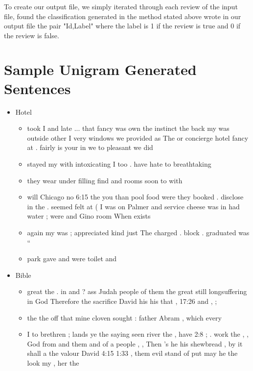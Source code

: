 \documentclass[11pt]{article}
\begin{document}

To create our output file, we simply iterated through each review of the input file, found the classification generated in the method stated above wrote in our output file the pair "Id,Label" where the label is 1 if the review is true and 0 if the review is false.



\section{Sample Unigram Generated Sentences}
\begin{itemize}
    \item Hotel
        \begin{itemize}
            \item took I and late ... that fancy was own the instinct the back my was outside other I very windows we provided as The or concierge hotel fancy at . fairly is your in we to pleasant we did
            \item stayed my with intoxicating I too . have hate to breathtaking
            \item they wear under filling find and rooms soon to with
            \item will Chicago no 6:15 the you than pool food were they booked . disclose in the . seemed felt at ( I was on Palmer and service cheese was in had water ; were and Gino room When exists
            \item again my was ; appreciated kind just The charged . block . graduated was ``
            \item park gave and were toilet and
        \end{itemize}
    \item Bible
        \begin{itemize}
            \item great the . in and ? ass Judah people of them the great still longsuffering in God Therefore the sacrifice David his his that , 17:26 and , ;

            \item the the off that mine cloven sought : father Abram , which every

            \item I to brethren ; lands ye the saying seen river the , have 2:8 ; . work the , , God from and them and of a people , , Then 's he his shewbread , by it shall a the valour David 4:15 1:33 , them evil stand of put                   may he the look my , her the


\end{itemize}
\end{itemize}
\end{document}
